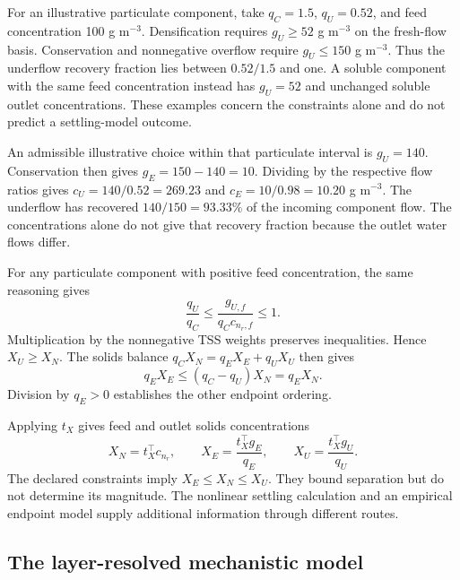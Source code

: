 For an illustrative particulate component, take $q_C=1.5$, $q_U=0.52$, and feed concentration 100 g m$^{-3}$. Densification requires $g_U\ge52$ g m$^{-3}$ on the fresh-flow basis. Conservation and nonnegative overflow require $g_U\le150$ g m$^{-3}$. Thus the underflow recovery fraction lies between $0.52/1.5$ and one. A soluble component with the same feed concentration instead has $g_U=52$ and unchanged soluble outlet concentrations. These examples concern the constraints alone and do not predict a settling-model outcome.

An admissible illustrative choice within that particulate interval is $g_U=140$. Conservation then gives $g_E=150-140=10$. Dividing by the respective flow ratios gives $c_U=140/0.52=269.23$ and $c_E=10/0.98=10.20$ g m$^{-3}$. The underflow has recovered $140/150=93.33\%$ of the incoming component flow. The concentrations alone do not give that recovery fraction because the outlet water flows differ.

For any particulate component with positive feed concentration, the same reasoning gives
\begin{equation}
\frac{q_U}{q_C}\le\frac{g_{U,f}}{q_Cc_{n_r,f}}\le1.
\end{equation}
Multiplication by the nonnegative TSS weights preserves inequalities. Hence $X_U\ge X_N$. The solids balance $q_CX_N=q_EX_E+q_UX_U$ then gives
\begin{equation}
q_EX_E\le(q_C-q_U)X_N=q_EX_N.
\end{equation}
Division by $q_E>0$ establishes the other endpoint ordering.

Applying $t_X$ gives feed and outlet solids concentrations
\begin{equation}
X_N=t_X^\top c_{n_r},\qquad
X_E=\frac{t_X^\top g_E}{q_E},\qquad
X_U=\frac{t_X^\top g_U}{q_U}.
\label{eq:plant_tss_endpoints}
\end{equation}
The declared constraints imply $X_E\le X_N\le X_U$. They bound separation but do not determine its magnitude. The nonlinear settling calculation and an empirical endpoint model supply additional information through different routes.

\subsection{The layer-resolved mechanistic model}

